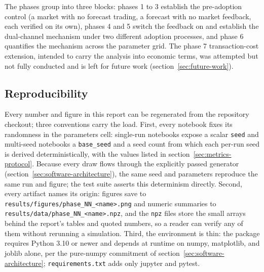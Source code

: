 \documentclass[12pt]{article}
\begin{document}
The phases group into three blocks: phases 1 to 3 establish the pre-adoption control (a market with no forecast trading, a forecast with no market feedback, each verified on its own), phases 4 and 5 switch the feedback on and establish the dual-channel mechanism under two different adoption processes, and phase 6 quantifies the mechanism across the parameter grid. The phase 7 transaction-cost extension, intended to carry the analysis into economic terms, was attempted but not fully conducted and is left for future work (section~\ref{sec:future-work}).

\subsection{Reproducibility}

Every number and figure in this report can be regenerated from the repository checkout; three conventions carry the load. %
First, every notebook fixes its randomness in the parameters cell: single-run notebooks expose a scalar \texttt{seed} and multi-seed notebooks a \texttt{base\_seed} and a seed count from which each per-run seed is derived deterministically, with the values listed in section~\ref{sec:metrics-protocol}. %
Because every draw flows through the explicitly passed generator (section~\ref{sec:software-architecture}), the same seed and parameters reproduce the same run and figure; the test suite asserts this determinism directly. %
Second, every artifact names its origin: figures save to \texttt{results/figures/phase\_NN\_<name>.png} and numeric summaries to \texttt{results/data/phase\_NN\_<name>.npz}, and the \texttt{npz} files store the small arrays behind the report's tables and quoted numbers, so a reader can verify any of them without rerunning a simulation. %
Third, the environment is thin: the package requires Python 3.10 or newer and depends at runtime on numpy, matplotlib, and joblib alone, per the pure-numpy commitment of section~\ref{sec:software-architecture}; \texttt{requirements.txt} adds only jupyter and pytest. %
\end{document}
